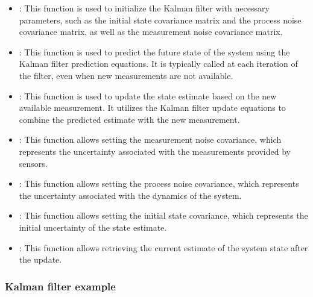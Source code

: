 \begin{itemize}
	\item {}: This function is used to initialize the Kalman filter with necessary parameters, such as the initial state covariance matrix and the process noise covariance matrix, as well as the measurement noise covariance matrix.
	
	\item {}: This function is used to predict the future state of the system using the Kalman filter prediction equations. It is typically called at each iteration of the filter, even when new measurements are not available.
	
	\item {}: This function is used to update the state estimate based on the new available measurement. It utilizes the Kalman filter update equations to combine the predicted estimate with the new measurement.
	
	\item {}: This function allows setting the measurement noise covariance, which represents the uncertainty associated with the measurements provided by sensors.
	
	\item {}: This function allows setting the process noise covariance, which represents the uncertainty associated with the dynamics of the system.
	
	\item {}: This function allows setting the initial state covariance, which represents the initial uncertainty of the state estimate.
	
	\item {}: This function allows retrieving the current estimate of the system state after the update.
	
\end{itemize}

\subsubsection{Kalman filter example}


{
	
	\label{KalmanFilter.ino}
	
}
